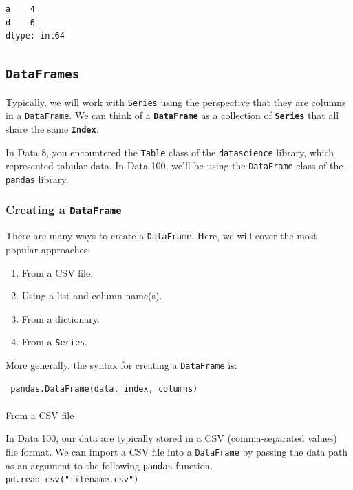 \documentclass[
  letterpaper,
  DIV=11,
  numbers=noendperiod]{scrreprt}
\makeatletter
\let\oldparagraph\paragraph
\renewcommand{\paragraph}{
    \@ifstar
      \xxxParagraphStar
      \xxxParagraphNoStar
  }
\newcommand{\xxxParagraphStar}[1]{\oldparagraph*{#1}\mbox{}}
\newcommand{\xxxParagraphNoStar}[1]{\oldparagraph{#1}\mbox{}}
\providecommand{\tightlist}{%
  \setlength{\itemsep}{0pt}\setlength{\parskip}{0pt}}\usepackage{longtable,booktabs,array}
\makeatother
\begin{document}
\begin{verbatim}
a    4
d    6
dtype: int64
\end{verbatim}

\subsection{\texorpdfstring{\texttt{DataFrames}}{DataFrames}}\label{dataframes}

Typically, we will work with \texttt{Series} using the perspective that
they are columns in a \texttt{DataFrame}. We can think of a
\textbf{\texttt{DataFrame}} as a collection of \textbf{\texttt{Series}}
that all share the same \textbf{\texttt{Index}}.

In Data 8, you encountered the \texttt{Table} class of the
\texttt{datascience} library, which represented tabular data. In Data
100, we'll be using the \texttt{DataFrame} class of the \texttt{pandas}
library.

\subsubsection{\texorpdfstring{Creating a
\texttt{DataFrame}}{Creating a DataFrame}}\label{creating-a-dataframe}

There are many ways to create a \texttt{DataFrame}. Here, we will cover
the most popular approaches:

\begin{enumerate}
\def\labelenumi{\arabic{enumi}.}
\tightlist
\item
  From a CSV file.
\item
  Using a list and column name(s).
\item
  From a dictionary.
\item
  From a \texttt{Series}.
\end{enumerate}

More generally, the syntax for creating a \texttt{DataFrame} is:

\begin{verbatim}
 pandas.DataFrame(data, index, columns)
\end{verbatim}

\paragraph{From a CSV file}\label{from-a-csv-file}

In Data 100, our data are typically stored in a CSV (comma-separated
values) file format. We can import a CSV file into a \texttt{DataFrame}
by passing the data path as an argument to the following \texttt{pandas}
function.  \texttt{pd.read\_csv("filename.csv")}
\end{document}
